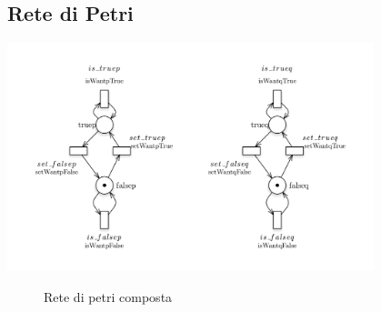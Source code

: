 \documentclass[a4paper]{article}
\begin{document}
\subsection{Rete di Petri}
\newpage
\begin{center}
\includegraphics[width=0.8\textwidth]{variables.png}
\end{center}
\newpage
\begin{figure}[!ht]
\centering
{}
\caption{Rete di petri composta} \label{FIG:3.9PN}
\end{figure}
\newpage
\end{document}
